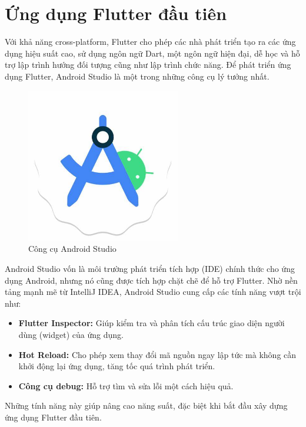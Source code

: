 \documentclass[../DoAn.tex]{subfiles}
\numberwithin{figure}{chapter}
\begin{document}
\section{Ứng dụng Flutter đầu tiên}
Với khả năng cross-platform, Flutter cho phép các nhà phát triển tạo ra các ứng dụng hiệu suất cao, sử dụng ngôn ngữ Dart, một ngôn ngữ hiện đại, dễ học và hỗ trợ lập trình hướng đối tượng cũng như lập trình chức năng. Để phát triển ứng dụng Flutter, Android Studio là một trong những công cụ lý tưởng nhất. 

\begin{figure}[H]
    \centering
    \includegraphics[width=0.6\textwidth]{Hinhve/Chuong5/androidstudio.jpg}
    \caption{Công cụ Android Studio}
    \label{fig:androidstudio}
\end{figure}

Android Studio vốn là môi trường phát triển tích hợp (IDE) chính thức cho ứng dụng Android, nhưng nó cũng được tích hợp chặt chẽ để hỗ trợ Flutter. Nhờ nền tảng mạnh mẽ từ IntelliJ IDEA, Android Studio cung cấp các tính năng vượt trội như:
\begin{itemize}
    \item \textbf{Flutter Inspector: } Giúp kiểm tra và phân tích cấu trúc giao diện người dùng (widget) của ứng dụng.
    \item \textbf{Hot Reload: } Cho phép xem thay đổi mã nguồn ngay lập tức mà không cần khởi động lại ứng dụng, tăng tốc quá trình phát triển.
    \item \textbf{Công cụ debug: } Hỗ trợ tìm và sửa lỗi một cách hiệu quả.
\end{itemize}

Những tính năng này giúp nâng cao năng suất, đặc biệt khi bắt đầu xây dựng ứng dụng Flutter đầu tiên.
\end{document}
